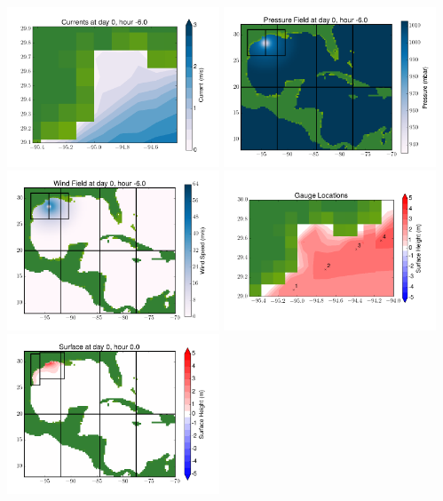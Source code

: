 \documentclass[11pt]{article}
\begin{document}
\vskip 10pt 
\includegraphics[width=0.475\textwidth]{frame0011fig7.png}
\includegraphics[width=0.475\textwidth]{frame0011fig8.png}
\vskip 10pt 
\includegraphics[width=0.475\textwidth]{frame0011fig9.png}
\includegraphics[width=0.475\textwidth]{frame0011fig10.png}
\vskip 10pt 
\includegraphics[width=0.475\textwidth]{frame0012fig1.png}
\end{document}
